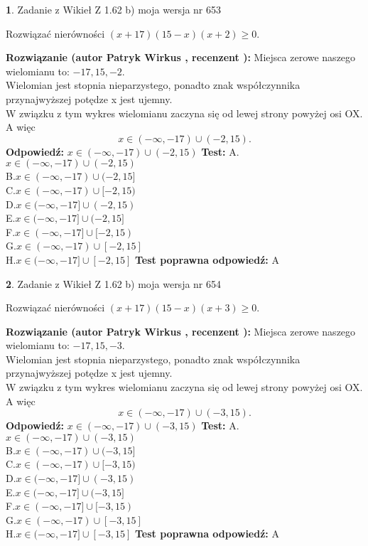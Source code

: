 \documentclass[12pt, a4paper]{article}
\theoremstyle{definition} %
\newtheorem{zad}{}
\newcommand{\zadStart}[1]{\begin{zad}#1\newline}
\newcommand{\zadStop}{\end{zad}}
\newcommand{\rozwStart}[2]{\noindent \textbf{Rozwiązanie (autor #1 , recenzent #2): }\newline}
\newcommand{\rozwStop}{\newline}
\newcommand{\odpStart}{\noindent \textbf{Odpowiedź:}\newline}
\newcommand{\odpStop}{\newline}
\newcommand{\testStart}{\noindent \textbf{Test:}\newline}
\newcommand{\testStop}{\newline}
\newcommand{\kluczStart}{\noindent \textbf{Test poprawna odpowiedź:}\newline}
\newcommand{\kluczStop}{\newline}
\begin{document}
\zadStart{Zadanie z Wikieł Z 1.62 b) moja wersja nr 653}

Rozwiązać nierówności $(x+17)(15-x)(x+2)\ge0$.
\zadStop
\rozwStart{Patryk Wirkus}{}
Miejsca zerowe naszego wielomianu to: $-17, 15, -2$.\\
Wielomian jest stopnia nieparzystego, ponadto znak współczynnika przy\linebreak najwyższej potędze x jest ujemny.\\ W związku z tym wykres wielomianu zaczyna się od lewej strony powyżej osi OX. A więc $$x \in (-\infty,-17) \cup (-2,15).$$
\rozwStop
\odpStart
$x \in (-\infty,-17) \cup (-2,15)$
\odpStop
\testStart
A.$x \in (-\infty,-17) \cup (-2,15)$\\
B.$x \in (-\infty,-17) \cup (-2,15]$\\
C.$x \in (-\infty,-17) \cup [-2,15)$\\
D.$x \in (-\infty,-17] \cup (-2,15)$\\
E.$x \in (-\infty,-17] \cup (-2,15]$\\
F.$x \in (-\infty,-17] \cup [-2,15)$\\
G.$x \in (-\infty,-17) \cup [-2,15]$\\
H.$x \in (-\infty,-17] \cup [-2,15]$
\testStop
\kluczStart
A
\kluczStop



\zadStart{Zadanie z Wikieł Z 1.62 b) moja wersja nr 654}

Rozwiązać nierówności $(x+17)(15-x)(x+3)\ge0$.
\zadStop
\rozwStart{Patryk Wirkus}{}
Miejsca zerowe naszego wielomianu to: $-17, 15, -3$.\\
Wielomian jest stopnia nieparzystego, ponadto znak współczynnika przy\linebreak najwyższej potędze x jest ujemny.\\ W związku z tym wykres wielomianu zaczyna się od lewej strony powyżej osi OX. A więc $$x \in (-\infty,-17) \cup (-3,15).$$
\rozwStop
\odpStart
$x \in (-\infty,-17) \cup (-3,15)$
\odpStop
\testStart
A.$x \in (-\infty,-17) \cup (-3,15)$\\
B.$x \in (-\infty,-17) \cup (-3,15]$\\
C.$x \in (-\infty,-17) \cup [-3,15)$\\
D.$x \in (-\infty,-17] \cup (-3,15)$\\
E.$x \in (-\infty,-17] \cup (-3,15]$\\
F.$x \in (-\infty,-17] \cup [-3,15)$\\
G.$x \in (-\infty,-17) \cup [-3,15]$\\
H.$x \in (-\infty,-17] \cup [-3,15]$
\testStop
\kluczStart
A
\kluczStop
\end{document}
